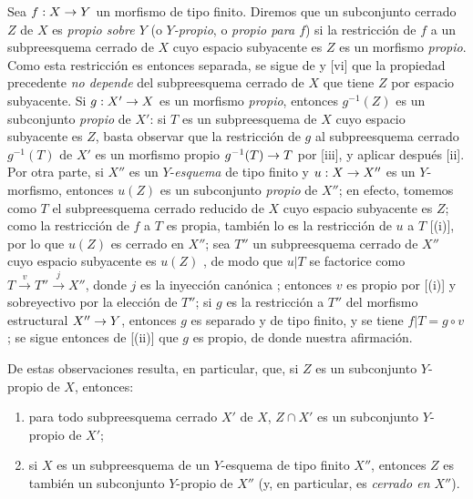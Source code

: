 \documentclass[oneside,10pt]{amsart}
\makeatletter
\newcommand{\ega@arrow}[2]{\mathchoice{#1}{#2}{#2}{#2}}
\renewcommand{\to}{\ega@arrow{\longrightarrow}{\rightarrow}}
\let\EGAOriginalLabel\label
\renewcommand{\label}[1]{\phantomsection\EGAOriginalLabel{#1}}
\makeatother
\begin{document}
\begin{env}[5.4.10]
\label{II.5.4.10}
Sea $f:X\to Y$ un morfismo de tipo finito.
Diremos que un subconjunto cerrado $Z$ de $X$ es \emph{propio sobre $Y$} (o \emph{$Y$-propio}, o \emph{propio para $f$}) si la restricción de $f$ a un subpreesquema cerrado de $X$ cuyo espacio subyacente es $Z$  es un morfismo \emph{propio}.
Como esta restricción es entonces separada, se sigue de  y [vi] que la propiedad precedente \emph{no depende} del subpreesquema cerrado de $X$ que tiene $Z$ por espacio subyacente.
Si $g:X'\to X$ es un morfismo \emph{propio}, entonces $g^{-1}(Z)$ es un subconjunto \emph{propio} de $X'$:
si $T$ es un subpreesquema de $X$ cuyo espacio subyacente es $Z$, basta observar que la restricción de $g$ al subpreesquema cerrado $g^{-1}(T)$ de $X'$ es un morfismo propio $g^{-1}(T)\to T$ por [iii], y aplicar después [ii].
Por otra parte, si $X''$ es un $Y$-\emph{esquema} de tipo finito y $u:X\to X''$ es un $Y$-morfismo, entonces $u(Z)$ es un subconjunto \emph{propio} de $X''$;
en efecto, tomemos como $T$ el subpreesquema cerrado reducido de $X$ cuyo espacio subyacente es $Z$;
como la restricción de $f$ a $T$ es propia, también lo es la restricción de $u$ a $T$ [(i)], por lo que $u(Z)$ es cerrado en $X''$;
sea $T''$ un subpreesquema cerrado de $X''$ cuyo espacio subyacente es $u(Z)$ , de modo que $u|T$ se factorice como $T\xrightarrow{v}T''\xrightarrow{j}X''$, donde $j$ es la inyección canónica ; entonces $v$ es propio por [(i)] y sobreyectivo por la elección de $T''$;
si $g$ es la restricción a $T''$ del morfismo estructural $X''\to Y$, entonces $g$ es separado y de tipo finito, y se tiene $f|T=g\circ v$;
se sigue entonces de [(ii)] que $g$ es propio, de donde nuestra afirmación.
\end{env}

De estas observaciones resulta, en particular, que, si $Z$ es un subconjunto $Y$-propio de $X$, entonces:
\begin{enumerate}
  \item para todo subpreesquema cerrado $X'$ de $X$, $Z\cap X'$ es un subconjunto $Y$-propio de $X'$;
  \item si $X$ es un subpreesquema de un $Y$-esquema de tipo finito $X''$, entonces $Z$ es también un subconjunto $Y$-propio de $X''$ (y, en particular, es \emph{cerrado en $X''$}).
\end{enumerate}
\end{document}
